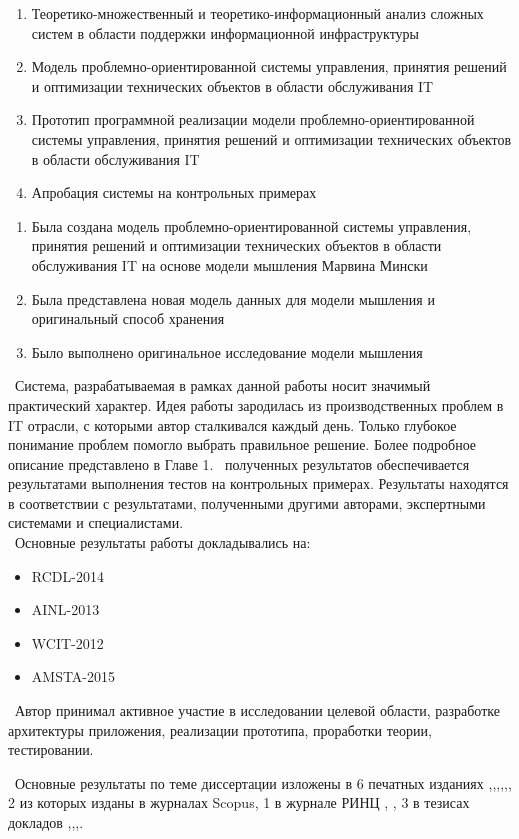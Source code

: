 \begin{enumerate}
  \item Теоретико-множественный и теоретико-информационный анализ сложных систем в области поддержки информационной инфраструктуры
  \item Модель проблемно-ориентированной системы управления, принятия решений и оптимизации технических объектов в области обслуживания IT  
  \item Прототип программной реализации модели проблемно-ориентированной системы управления, принятия решений и оптимизации технических объектов в области обслуживания IT  
  \item Апробация системы на контрольных примерах
\end{enumerate}

\novelty
\begin{enumerate}
  \item Была создана модель проблемно-ориентированной системы управления, принятия решений и оптимизации технических объектов в области обслуживания IT на основе модели мышления Марвина Мински
  \item Была представлена новая модель данных для модели мышления и оригинальный способ хранения 
  \item Было выполнено оригинальное исследование модели мышления 
\end{enumerate}

\influence\ 
Система, разрабатываемая в рамках данной работы носит значимый практический характер. Идея работы зародилась из производственных проблем в IT отрасли, с которыми автор сталкивался каждый день. Только глубокое понимание проблем помогло выбрать правильное решение. Более подробное описание представлено в Главе 1.
\reliability\ полученных результатов обеспечивается результатами выполнения тестов на контрольных примерах. Результаты находятся в соответствии с результатами, полученными другими авторами, экспертными системами и специалистами. \\ 

\probation\
Основные результаты работы докладывались на:
\begin{itemize}
	\item RCDL-2014
	\item AINL-2013
	\item WCIT-2012
	\item AMSTA-2015
\end{itemize}

\contribution\ Автор принимал активное участие в исследовании целевой области, разработке архитектуры приложения, реализации прототипа, проработки теории, тестировании.

\publications\ Основные результаты по теме диссертации изложены в 6 печатных изданиях  \cite{Lobachevskii},\cite{WCIT-2012},\cite{RCDL-2014},\cite{AINL-2013},\cite{ISGZ},\cite{AMSTA-2015}, 
2 из которых изданы в журналах Scopus, 1 в журнале РИНЦ  \cite{ISGZ},
\cite{RCDL-2014}, \cite{AMSTA-2015} 
3 в тезисах докладов \cite{Lobachevskii},\cite{WCIT-2012},\cite{AINL-2013},\cite{ISGZ}.



